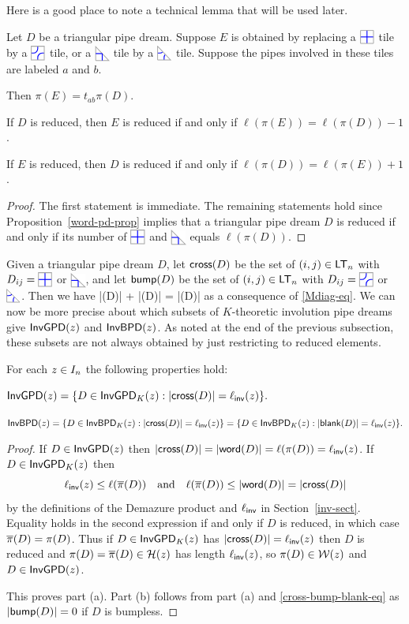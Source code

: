 \documentclass[10pt]{article}
\begin{document}
 Here is a good place to note a technical lemma that will be used later.
 
 \begin{lemma}
\label{L: local reconnection}
Let $D$ be a triangular pipe dream.
Suppose $E$ is obtained by replacing a $\PTILE$ tile by a $\ETILE$ tile,
or a $\PDIAG$ tile by a $\EDIAG$ tile. Suppose the pipes involved in these tiles are labeled $a$ and $b$.
\ben\item[(a)] Then $\pi(E)=t_{ab}\pi(D)$.
\item[(b)] If $D$ is reduced, then $E$ is reduced 
if and only if $\ell(\pi(E))=\ell(\pi(D))-1$.
\item[(c)] If $E$ is reduced, then $D$ is reduced if and only if
$\ell(\pi(D))=\ell(\pi(E))+1$.
\een
\end{lemma}
\begin{proof}
The first statement is immediate. 
The remaining statements hold since Proposition~\ref{word-pd-prop} implies that a triangular pipe dream $D$ is reduced
if and only if its number of $\PTILE$
and $\PDIAG$ equals $\ell(\pi(D))$.
\end{proof}


 Given a triangular pipe dream $D$, 
 let $\mathsf{cross}(D)$ be the set of $(i,j) \in \mathsf{LT}_n$ with $D_{ij} = \PTILE$ or $\PDIAG$,
 and let $\mathsf{bump}(D)$ be the set of $(i,j) \in \mathsf{LT}_n$ with $D_{ij} = \ETILE$ or $\EDIAG$.
Then we have
 \be\label{cross-bump-blank-eq}
 |\cross(D)| + |\bump(D)| = |\blank(D)|
 \ee
as a consequence of \eqref{Mdiag-eq}.
We can now be more precise about which subsets of
$K$-theoretic involution pipe dreams 
give $ \mathsf{InvGPD}(z)$ and $ \mathsf{InvBPD}(z)$.
As noted at the end of the previous subsection,
these subsets are not always obtained by just restricting to reduced elements.

 \begin{corollary}\label{k-sub-cor}
 For each $z \in I_n $ the following properties hold:
 \ben
 \item[(a)]
$ \mathsf{InvGPD}(z) = \{ D \in \mathsf{InvGPD}_K(z) : |\mathsf{cross}(D)| = \ell_{\mathsf{inv}}(z)\}.$

 \item[(b)]
$ \mathsf{InvBPD}(z) = \{ D \in \mathsf{InvBPD}_K(z) : |\mathsf{cross}(D)| = \ell_{\mathsf{inv}}(z)\}= \{ D \in \mathsf{InvBPD}_K(z) :  |\mathsf{blank}(D)| = \ell_{\mathsf{inv}}(z)\}.$
\een
 \end{corollary}
 
 \begin{proof}
 If $D \in \mathsf{InvGPD}(z)$ then $|\mathsf{cross}(D)| = |\mathsf{word}(D)| = \ell(\pi(D)) = \ell_{\mathsf{inv}}(z)$.
If 
 $D \in \mathsf{InvGPD}_K(z)$ then 
 \[ \ell_{\mathsf{inv}}(z) \leq \ell(\overline{\pi}(D))
 \quad\text{and}\quad 
 \ell(\overline{\pi}(D)) \leq |\mathsf{word}(D)| = |\mathsf{cross}(D)|
 \]
  by the definitions of the Demazure product and $\ell_{\mathsf{inv}}$ in Section~\ref{inv-sect}.
Equality holds in the second expression if and only if $D$ is reduced, in which case $\overline{\pi}(D) = \pi(D)$.
 Thus if  $D \in \mathsf{InvGPD}_K(z)$ has $|\mathsf{cross}(D)| = \ell_{\mathsf{inv}}(z)$
 then $D$ is reduced and $\pi(D) = \overline{\pi}(D) \in \mathcal H(z)$ has length $\ell_{\mathsf{inv}}(z)$, so $\pi(D) \in \mathcal{W}(z)$ and $D \in  \mathsf{InvGPD}(z)$.
 
 
This proves part (a). Part (b) follows from part (a) and 
  \eqref{cross-bump-blank-eq}
  as $|\mathsf{bump}(D)|=0$ if $D$ is bumpless.
  \end{proof}
  
\end{document}
